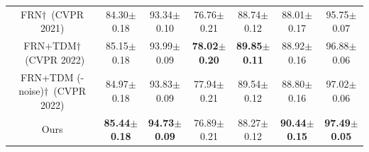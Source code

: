 \documentclass[letterpaper]{article} %
\begin{document}
\begin{table}[!ht]
\begin{tabular}{ccccccc}
FRN$\dag$~(CVPR 2021)%
& 84.30$\pm$0.18   
& 93.34$\pm$0.10         
& {76.76$\pm$0.21}      
& {88.74$\pm$0.12}        
& 88.01$\pm$0.17     
& 95.75$\pm$0.07 \\ 

FRN+TDM$\dag$~(CVPR 2022)%
& 85.15$\pm$0.18        
& 93.99$\pm$0.09         
& \textbf{78.02$\pm$0.20}   
& \textbf{89.85$\pm$0.11} 
& 88.92$\pm$0.16
& 96.88$\pm$0.06  \\ 



FRN+TDM (-noise)$\dag$~(CVPR 2022)%
& 84.97$\pm$0.18        
& 93.83$\pm$0.09         
& 77.94$\pm$0.21      
& 89.54$\pm$0.12
& 88.80$\pm$0.16
& 97.02$\pm$0.06  \\ 

Ours                    
& \textbf{85.44$\pm$0.18}   
& \textbf{94.73$\pm$0.09}   
& {76.89$\pm$0.21}   
& 88.27$\pm$0.12 
& \textbf{90.44$\pm$0.15} 
& \textbf{97.49$\pm$0.05} \\ \bottomrule
\end{tabular}
\end{table}
\end{document}
